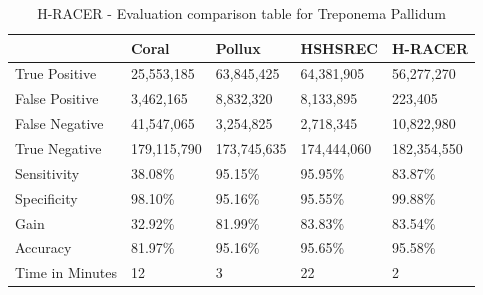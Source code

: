 \documentclass[12pt,openany]{llncs}
\newcommand{\TBstrut}{{\rule{0pt}{7ex}}{\rule[2ex]{0pt}{0pt}}} %
\begin{document}
\begin{longtable}{|m{33mm}|m{20mm}|m{20mm}|m{20mm}|m{20mm}|}
	    \caption{\label{tab:eval-2}H-RACER - Evaluation comparison table for Treponema Pallidum}\\
        \hline
           & Coral & Pollux & HSHSREC & H-RACER\cellcolor{DarkGray} \TBstrut\\ %
        \hline
           True Positive & 25,553,185 & 63,845,425 & 64,381,905 & 56,277,270\cellcolor{LightGray} \TBstrut\\ %
        \hline
           False Positive & 3,462,165 & 8,832,320 & 8,133,895 & 223,405\cellcolor{LightGray} \TBstrut\\ %
        \hline
           False Negative & 41,547,065 & 3,254,825 & 2,718,345 & 10,822,980\cellcolor{LightGray} \TBstrut\\ %
        \hline
           True Negative & 179,115,790 & 173,745,635 & 174,444,060 & 182,354,550\cellcolor{LightGray} \TBstrut\\ %
        \hline
           Sensitivity & 38.08\% & 95.15\% & 95.95\% & 83.87\%\cellcolor{LightGray} \TBstrut\\ %
        \hline
           Specificity & 98.10\% &  95.16\% & 95.55\% & 99.88\%\cellcolor{LightGray} \TBstrut\\ %
        \hline
           Gain & 32.92\% & 81.99\% & 83.83\% & 83.54\%\cellcolor{LightGray} \TBstrut\\ %
        \hline
           Accuracy & 81.97\% & 95.16\% & 95.65\% & 95.58\%\cellcolor{LightGray} \TBstrut\\ %
        \hline
           Time in Minutes& 12 & 3 & 22 & 2\cellcolor{LightGray} \TBstrut\\ %
        \hline
\end{longtable}
\newpage
\end{document}
